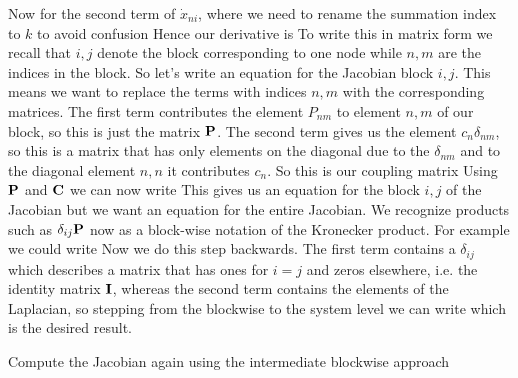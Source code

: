 Now for the second term of $\dot{x}_{ni}$, where we need to rename the summation index to $k$ to avoid confusion 
Hence our derivative is 
To write this in matrix form we recall that $i,j$ denote the block corresponding to one node while $n,m$ are the indices in the block. 
So let's write an equation for the Jacobian block $i,j$. This means we want to replace the terms with indices $n,m$ with the corresponding matrices. The first term contributes the element $P_{nm}$ to element $n,m$ of our block, so this is just the matrix $\bf P$. The second term gives us the element $c_n \delta_{nm}$, so this is a matrix that has only elements on the diagonal due to the $\delta_{nm}$ and to the diagonal element $n,n$ it contributes $c_n$. So this is our coupling matrix 
Using $\bf P$ and $\bf C$ we can now write 
This gives us an equation for the block $i,j$ of the Jacobian but we want an equation for the entire Jacobian. We recognize products such as $\delta_{ij} {\bf P}$ now as a block-wise notation of the Kronecker product. For example we could write
Now we do this step backwards. The first term contains a $\delta_{ij}$ which describes a matrix that has ones for $i=j$ and zeros elsewhere, i.e. the identity matrix $\bf I$, whereas the second term contains the elements of the Laplacian, so stepping from the blockwise to the system level we can write 
which is the desired result. 

\subquestion 
Compute the Jacobian again using the intermediate blockwise approach

